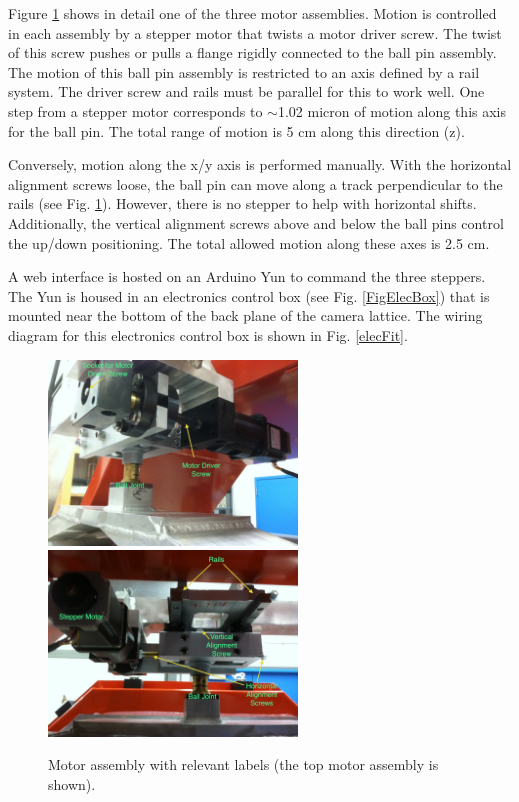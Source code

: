 \documentclass[11pt]{article}
\begin{document}
Figure \ref{FigMotor} shows in detail one of the three motor assemblies.
Motion is controlled in each assembly by a stepper motor that twists a motor driver screw.
The twist of this screw pushes or pulls a flange rigidly connected to the ball pin assembly.
The motion of this ball pin assembly is restricted to an axis defined by a rail system.
The driver screw and rails must be parallel for this to work well.
One step from a stepper motor corresponds to $\sim$1.02 micron of motion along this axis for the ball pin.
The total range of motion is 5 cm along this direction (z).

Conversely, motion along the x/y axis is performed manually.
With the horizontal alignment screws loose, the ball pin can move along a track perpendicular to the rails (see Fig. \ref{FigMotor}).
However, there is no stepper to help with horizontal shifts.
Additionally, the vertical alignment screws above and below the ball pins control the up/down positioning.
The total allowed motion along these axes is 2.5 cm.

A web interface is hosted on an Arduino Yun to command the three steppers.
The Yun is housed in an electronics control box (see Fig. \ref{FigElecBox}) that is mounted near the bottom of the back plane of the camera lattice.
The wiring diagram for this electronics control box is shown in Fig. \ref{elecFit}.

\begin{figure}[h]
\begin{center}
\includegraphics[width = 2.6in]{motorAss1Edit.JPG}
\includegraphics[width = 2.6in]{motorAss2Edit.JPG}
\caption{Motor assembly with relevant labels (the top motor assembly is shown).}  
\label{FigMotor}
\end{center}
\end{figure}
\end{document}
